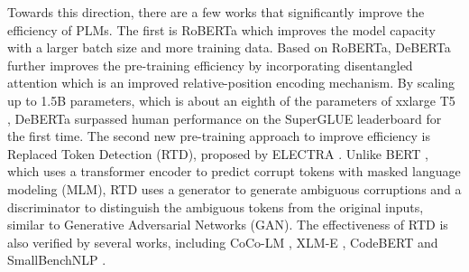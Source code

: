 Towards this direction, there are a few works that significantly improve the efficiency of PLMs. The first is RoBERTa \citep{liu2019roberta} which improves the model capacity with a larger batch size and more training data. Based on RoBERTa, DeBERTa \citep{he2020deberta} further improves the pre-training efficiency by incorporating disentangled attention which is an improved relative-position encoding mechanism. By scaling up to 1.5B parameters, which is about an eighth of the parameters of xxlarge T5 \citep{raffel2019t5}, DeBERTa surpassed human performance on the SuperGLUE \citep{wang2019superglue} leaderboard for the first time. The second new pre-training approach to improve efficiency is Replaced Token Detection (RTD), proposed by ELECTRA \citep{clark2020electra}. Unlike BERT \citep{devlin2018bert}, which  uses a transformer encoder to predict corrupt tokens with masked language modeling (MLM), RTD uses a generator to generate ambiguous corruptions and a discriminator to distinguish the ambiguous tokens from the original inputs, similar to Generative Adversarial Networks (GAN). The effectiveness of RTD is also verified by several works, including CoCo-LM \citep{meng2021coco}, XLM-E \citep{chi2021xlm}, CodeBERT\citep{feng2020codebert} and SmallBenchNLP \citep{Kanakarajan2021SmallBenchNB}. 


